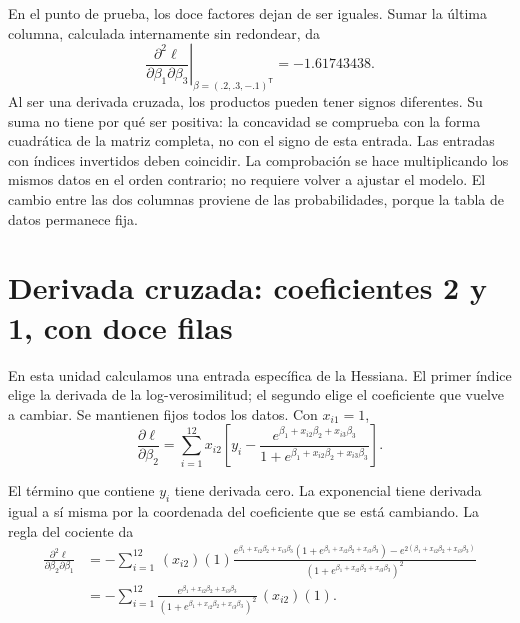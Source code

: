 \documentclass[11pt,a4paper]{article}
\newcommand{\T}{^{\mathsf T}}
\begin{document}
En el punto de prueba, los doce factores dejan de ser iguales.
Sumar la última columna, calculada internamente sin redondear, da
\[
\left.\frac{\partial^2\ell}{\partial\beta_1\partial\beta_3}\right|_{\beta=(.2,.3,-.1)\T}=-1.61743438.
\]
Al ser una derivada cruzada, los productos pueden tener signos diferentes. Su suma no tiene por qué ser positiva: la concavidad se comprueba con la forma cuadrática de la matriz completa, no con el signo de esta entrada.
Las entradas con índices invertidos deben coincidir.
La comprobación se hace multiplicando los mismos datos en el orden
contrario; no requiere volver a ajustar el modelo.
El cambio entre las dos columnas proviene de las probabilidades,
porque la tabla de datos permanece fija.

\clearpage
\section{Derivada cruzada: coeficientes 2 y 1, con doce filas}\label{logit22}
En esta unidad calculamos una entrada específica de la Hessiana.
El primer índice elige la derivada de la log-verosimilitud; el segundo
elige el coeficiente que vuelve a cambiar.
Se mantienen fijos todos los datos. Con $x_{i1}=1$,
\[
\frac{\partial\ell}{\partial\beta_2}=\sum_{i=1}^{12}x_{i2}\left[y_i-\frac{e^{\beta_1+x_{i2}\beta_2+x_{i3}\beta_3}}{1+e^{\beta_1+x_{i2}\beta_2+x_{i3}\beta_3}}\right].
\]

El término que contiene $y_i$ tiene derivada cero.
La exponencial tiene derivada igual a sí misma por la coordenada
del coeficiente que se está cambiando. La regla del cociente da
\[
\begin{aligned}
\frac{\partial^2\ell}{\partial\beta_2\partial\beta_1}&=-\sum_{i=1}^{12}\,(x_{i2})(1)\frac{e^{\beta_1+x_{i2}\beta_2+x_{i3}\beta_3}(1+e^{\beta_1+x_{i2}\beta_2+x_{i3}\beta_3})-e^{2(\beta_1+x_{i2}\beta_2+x_{i3}\beta_3)}}{(1+e^{\beta_1+x_{i2}\beta_2+x_{i3}\beta_3})^2}\\&=-\sum_{i=1}^{12}\frac{e^{\beta_1+x_{i2}\beta_2+x_{i3}\beta_3}}{(1+e^{\beta_1+x_{i2}\beta_2+x_{i3}\beta_3})^2}\,(x_{i2})(1).\end{aligned}
\]
\end{document}
